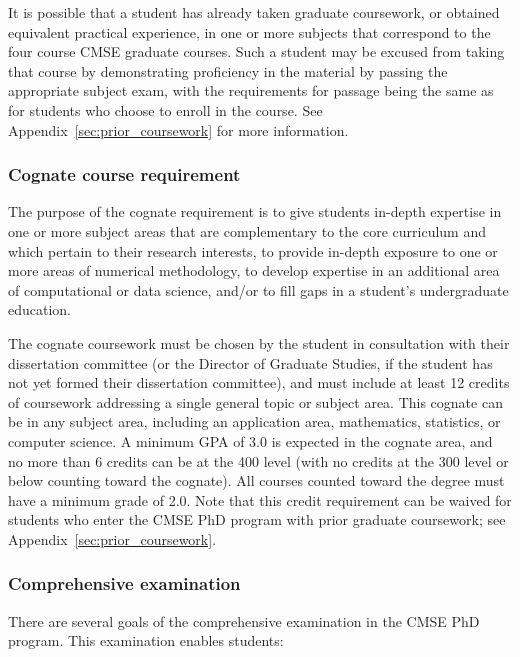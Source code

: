 It is possible that a student has already taken graduate coursework,
or obtained equivalent practical experience, in one or more subjects
that correspond to the four course CMSE graduate courses.  Such a
student may be excused from taking that course by demonstrating
proficiency in the material by passing the appropriate subject exam,
with the requirements for passage being the same as for students who
choose to enroll in the course.  See
Appendix~\ref{sec:prior_coursework} for more information.

\vspace{3mm}
\subsubsection{Cognate course requirement}
\label{sec:cognate_course}

The purpose of the cognate requirement is to give students in-depth
expertise in one or more subject areas that are complementary to the
core curriculum and which pertain to their research interests, to
provide in-depth exposure to one or more areas of numerical
methodology, to develop expertise in an additional area of
computational or data science, and/or to fill gaps in a student's
undergraduate education.

The cognate coursework must be chosen by the student in consultation
with their dissertation committee (or the Director of Graduate
Studies, if the student has not yet formed their dissertation
committee), and must include at least 12 credits of 
coursework addressing a single general topic or subject area.  This
cognate can be in any subject area, including an application area,
mathematics, statistics, or computer science.  A minimum GPA of 3.0 is
expected in the cognate area, and no more than 6 credits can be at
the 400 level (with no credits at the 300 level or below counting
toward the cognate).  All courses counted toward the degree must
have a minimum grade of 2.0.  Note that this
credit requirement can be waived for students who enter the CMSE PhD
program with prior graduate coursework; see
Appendix~\ref{sec:prior_coursework}.

\vspace{3mm}
\subsubsection{Comprehensive examination}
\label{sec:comp_exam}

There are several goals of the comprehensive examination in the CMSE
PhD program.  This examination enables students:

